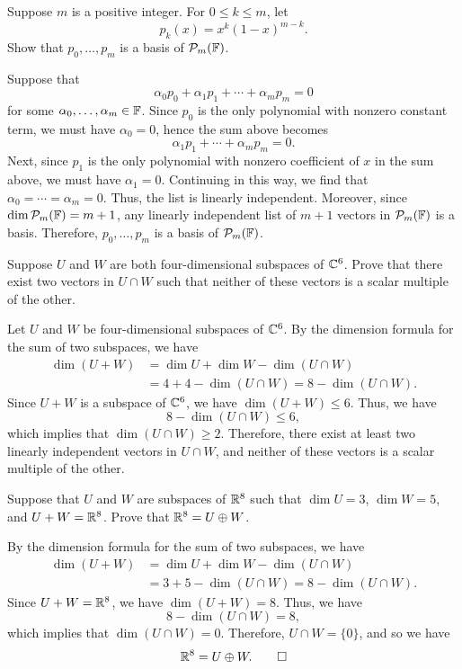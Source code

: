 \begin{exc}
\begin{exercise}
Suppose $m$ is a positive integer. For $0\le k\le m$, let
\[ p_k(x) = x^k(1-x)^{m-k}. \]
Show that $p_0,\dots,p_m$ is a basis of $\mathcal{P}_m(\mathbb{F})$.
\end{exercise}
\begin{solution}
Suppose that
\[ \alpha_0p_0+\alpha_1p_1+\cdots+\alpha_mp_m = 0 \]
for some $\alpha_0,\dots,\alpha_m\in\mathbb{F}$. Since $p_0$ is the only polynomial with
nonzero constant term, we must have $\alpha_0=0$, hence the sum above becomes
\[ \alpha_1p_1+\cdots+\alpha_mp_m = 0. \]
Next, since $p_1$ is the only polynomial with nonzero coefficient of $x$ in the
sum above, we must have $\alpha_1=0$. Continuing in this way, we find that
$\alpha_0=\cdots=\alpha_m=0$. Thus, the list is linearly independent. Moreover,
since $\operatorname{dim}\mathcal{P}_m(\mathbb{F})=m+1$, any linearly independent list of $m+1$ vectors in
$\mathcal{P}_m(\mathbb{F})$ is a basis. Therefore, $p_0,\dots,p_m$ is a basis of
$\mathcal{P}_m(\mathbb{F})$.
\end{solution}

\begin{exercise}
Suppose $U$ and $W$ are both four-dimensional subspaces of $\mathbb{C}^6$. Prove that
there exist two vectors in $U\cap W$ such that neither of these vectors is a
scalar multiple of the other.
\end{exercise}
\begin{solution}
Let $U$ and $W$ be four-dimensional subspaces of $\mathbb{C}^6$. By the dimension
formula for the sum of two subspaces, we have
\begin{align*}
\dim(U+W) &= \dim U+\dim W-\dim(U\cap W)\\
  &= 4+4-\dim(U\cap W) = 8-\dim(U\cap W).
\end{align*}
Since $U+W$ is a subspace of $\mathbb{C}^6$, we have $\dim(U+W)\le6$. Thus, we have
\[ 8-\dim(U\cap W) \le 6, \]
which implies that $\dim(U\cap W)\ge2$. Therefore, there exist at least two
linearly independent vectors in $U\cap W$, and neither of these vectors is a
scalar multiple of the other.
\end{solution}

\begin{exercise}
Suppose that $U$ and $W$ are subspaces of $\mathbb{R}^8$ such that $\dim U=3$,
$\dim W=5$, and $U+W=\mathbb{R}^8$. Prove that $\mathbb{R}^8=U\oplus W$.
\end{exercise}
\begin{solution}
By the dimension formula for the sum of two subspaces, we have
\begin{align*}
\dim(U+W) &= \dim U+\dim W-\dim(U\cap W)\\
  &= 3+5-\dim(U\cap W) = 8-\dim(U\cap W).
\end{align*}
Since $U+W=\mathbb{R}^8$, we have $\dim(U+W)=8$. Thus, we have
\[ 8-\dim(U\cap W) = 8, \]
which implies that $\dim(U\cap W)=0$. Therefore, $U\cap W=\{0\}$, and so we
have
\[ \mathbb{R}^8 = U\oplus W. \qedhere \]
\end{solution}


\end{exc}
